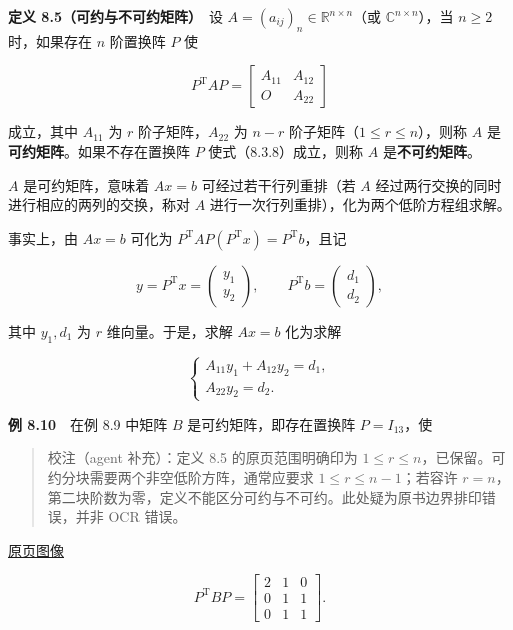 \documentclass[
  10pt,
  fontset=fandol]{ctexart}
\begin{document}
\textbf{定义 8.5（可约与不可约矩阵）}　设 \(A=(a_{ij})_n\in\mathbb R^{n\times n}\)（或 \(\mathbb C^{n\times n}\)），当 \(n\geqslant2\) 时，如果存在 \(n\) 阶置换阵 \(P\) 使

\[
P^{\mathrm T}AP=\begin{bmatrix}A_{11}&A_{12}\\O&A_{22}\end{bmatrix}
\tag{8.3.8}
\]

成立，其中 \(A_{11}\) 为 \(r\) 阶子矩阵，\(A_{22}\) 为 \(n-r\) 阶子矩阵（\(1\leqslant r\leqslant n\)），则称 \(A\) 是\textbf{可约矩阵}。如果不存在置换阵 \(P\) 使式（8.3.8）成立，则称 \(A\) 是\textbf{不可约矩阵}。

\(A\) 是可约矩阵，意味着 \(Ax=b\) 可经过若干行列重排（若 \(A\) 经过两行交换的同时进行相应的两列的交换，称对 \(A\) 进行一次行列重排），化为两个低阶方程组求解。

事实上，由 \(Ax=b\) 可化为 \(P^{\mathrm T}AP(P^{\mathrm T}x)=P^{\mathrm T}b\)，且记

\[
y=P^{\mathrm T}x=\begin{pmatrix}y_1\\y_2\end{pmatrix},\qquad
P^{\mathrm T}b=\begin{pmatrix}d_1\\d_2\end{pmatrix},
\]

其中 \(y_1,d_1\) 为 \(r\) 维向量。于是，求解 \(Ax=b\) 化为求解

\[
\begin{cases}
A_{11}y_1+A_{12}y_2=d_1,\\
A_{22}y_2=d_2.
\end{cases}
\]

\textbf{例 8.10}　在例 8.9 中矩阵 \(B\) 是可约矩阵，即存在置换阵 \(P=I_{13}\)，使

\begin{quote}
校注（agent 补充）：定义 8.5 的原页范围明确印为 \(1\leqslant r\leqslant n\)，已保留。可约分块需要两个非空低阶方阵，通常应要求 \(1\leqslant r\leqslant n-1\)；若容许 \(r=n\)，第二块阶数为零，定义不能区分可约与不可约。此处疑为原书边界排印错误，并非 OCR 错误。
\end{quote}

\href{../../source-images/pdf-225.jpeg}{原页图像}

\[
P^{\mathrm T}BP=\left[\begin{array}{c|cc}2&1&0\\\hline0&1&1\\0&1&1\end{array}\right].
\]
\end{document}
